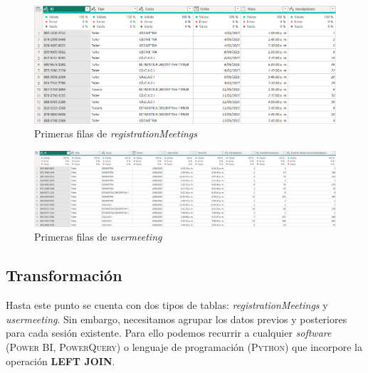 \documentclass[11pt,a4paper]{book}
\theoremstyle{definition}%
\begin{document}
                \begin{figure}[H]
                    \centering
                    \includegraphics[width=1\textwidth]{Sources/registrationMeetings_Head.png}
                    \caption{Primeras filas de \textit{registrationMeetings}}
                    \label{fig:registrationMeetings_head}
                \end{figure}
                \begin{figure}[H]
                    \centering
                    \includegraphics[width=1\textwidth]{Sources/usermeetings_Head.png}
                    \caption{Primeras filas de \textit{usermeeting}}
                    \label{fig:usermeetings_head}
                \end{figure}
            \subsection{Transformación}
                Hasta este punto se cuenta con dos tipos de tablas: \textit{registrationMeetings} y \textit{usermeeting}. Sin embargo, necesitamos agrupar los datos previos y posteriores para cada sesión existente. Para ello podemos recurrir a cualquier \textit{software} (\textsc{Power BI}, \textsc{PowerQuery}) o lenguaje de programación (\textsc{Python}) que incorpore la operación \textbf{LEFT JOIN}.
\end{document}
